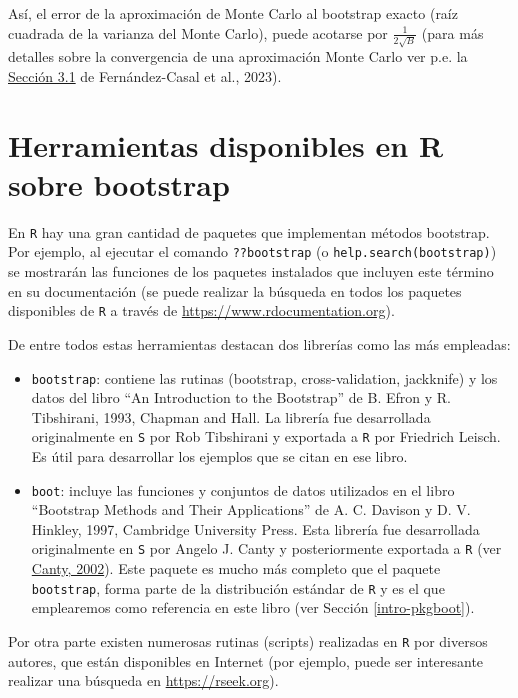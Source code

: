 \documentclass[
]{book}
\theoremstyle{break}
\theoremstyle{nonumberplain}
\begin{document}
Así, el error de la aproximación de Monte Carlo al bootstrap exacto
(raíz cuadrada de la varianza del Monte Carlo), puede acotarse por
\(\frac{1}{2\sqrt{B}}\)
(para más detalles sobre la convergencia de una aproximación Monte Carlo ver p.e. la \href{https://rubenfcasal.github.io/simbook/convergencia.html}{Sección 3.1} de Fernández-Casal et al., 2023).

\section{Herramientas disponibles en R sobre bootstrap}\label{intro-paquetes}

En \texttt{R} hay una gran cantidad de paquetes que implementan métodos bootstrap.
Por ejemplo, al ejecutar el comando \texttt{??bootstrap} (o \texttt{help.search(\textquotesingle{}bootstrap\textquotesingle{})})
se mostrarán las funciones de los paquetes instalados que incluyen este término
en su documentación (se puede realizar la búsqueda en todos los paquetes disponibles
de \texttt{R} a través de \url{https://www.rdocumentation.org}).

De entre todos estas herramientas destacan dos librerías
como las más empleadas:

\begin{itemize}
\item
  \texttt{bootstrap}: contiene las rutinas (bootstrap, cross-validation,
  jackknife) y los datos del libro ``An Introduction to the Bootstrap'' de B.
  Efron y R. Tibshirani, 1993, Chapman and Hall. La librería fue
  desarrollada originalmente en \texttt{S} por Rob Tibshirani y exportada a \texttt{R} por
  Friedrich Leisch. Es útil para desarrollar los ejemplos que se citan en
  ese libro.
\item
  \texttt{boot}: incluye las funciones y conjuntos de datos utilizados en el libro
  ``Bootstrap Methods and Their Applications'' de A. C. Davison y D. V. Hinkley, 1997,
  Cambridge University Press. Esta librería fue desarrollada originalmente
  en \texttt{S} por Angelo J. Canty y posteriormente exportada a \texttt{R} (ver \href{https://www.r-project.org/doc/Rnews/Rnews_2002-3.pdf}{Canty, 2002}).
  Este paquete es mucho más completo que el paquete \texttt{bootstrap}, forma parte de la distribución estándar de \texttt{R} y es el que emplearemos como referencia en este libro (ver Sección \ref{intro-pkgboot}).
\end{itemize}

Por otra parte existen numerosas rutinas (scripts) realizadas en \texttt{R} por
diversos autores, que están disponibles en Internet
(por ejemplo, puede ser interesante realizar una búsqueda en
\url{https://rseek.org}).
\end{document}
